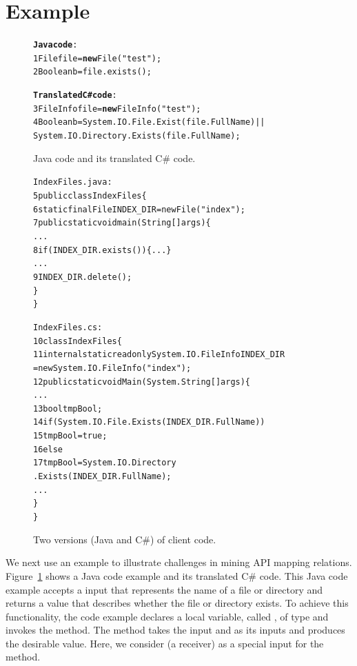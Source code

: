 \section{Example}
\label{sec:example}

\begin{figure}[t]
\begin{CodeOut}
\begin{alltt}
\textbf{Java code}:
1  File file = \textbf{new} File("test");
2  Boolean b = file.exists();

\textbf{Translated C\# code}:
3  FileInfo file = \textbf{new} FileInfo("test");
4  Boolean b = System.IO.File.Exist(file.FullName)||
           System.IO.Directory.Exists(file.FullName);
\end{alltt}
\end{CodeOut}\vspace*{-4ex}
\caption{\label{fig:challenge}Java code and its translated C\# code.}%
\end{figure}
\begin{figure}[t]
\begin{CodeOut}\vspace*{-1ex}
\begin{alltt}
  IndexFiles.java:
5 public class IndexFiles \{
6   static final File INDEX_DIR = new File("index");
7   public static void main(String[] args) \{
      ...
8     if (INDEX_DIR.exists()) \{...\}
      ...
9       INDEX_DIR.delete();
    \}
  \}

  IndexFiles.cs:
10 class IndexFiles\{
11   internal static readonly System.IO.FileInfo INDEX_DIR
          = new System.IO.FileInfo("index");
12   public static void  Main(System.String[] args)\{
      ...
13     bool tmpBool;
14     if (System.IO.File.Exists(INDEX_DIR.FullName))
15       tmpBool = true;
16    else
17       tmpBool = System.IO.Directory
                         .Exists(INDEX_DIR.FullName);
      ...
    \}
 \}
\end{alltt}
\end{CodeOut}\vspace*{-4ex}
\caption{\label{fig:clientcode} Two versions (Java and C\#) of
client code.}\vspace*{-2ex}
\end{figure}

We next use an example to illustrate challenges in mining 
API mapping relations. Figure~\ref{fig:challenge} shows a
Java code example and its translated C\# code. This Java code
example accepts a  input that represents the name of a
file or directory and returns a  value that
describes whether the file or directory exists. To achieve this functionality, the
code example declares a local variable, called , of
type  and invokes the  method. The
method takes the  input and  as its
inputs and produces the desirable  value. Here, we
consider  (a receiver) as a special input for
the  method.

